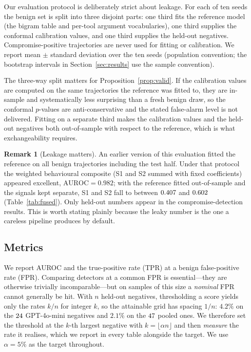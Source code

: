 \documentclass[preprint,12pt,authoryear]{elsarticle}
\theoremstyle{definition}
\newtheorem{remark}{Remark}
\begin{document}
Our evaluation protocol is deliberately strict about leakage. For each of ten
seeds the benign set is split into three disjoint parts: one third fits the
reference model (the bigram table and per-tool argument vocabularies), one third
supplies the conformal calibration values, and one third supplies the held-out
negatives. Compromise-positive trajectories are never used for fitting or
calibration. We report mean $\pm$ standard deviation over the ten seeds (population
convention; the bootstrap intervals in Section~\ref{sec:results} use the sample
convention).

The three-way split matters for Proposition~\ref{prop:valid}. If the calibration
values are computed on the same trajectories the reference was fitted to, they are
in-sample and systematically less surprising than a fresh benign draw, so the
conformal $p$-values are anti-conservative and the stated false-alarm level is not
delivered. Fitting on a separate third makes the calibration values and the
held-out negatives both out-of-sample with respect to the reference, which is what
exchangeability requires.

\begin{remark}[Leakage matters]
An earlier version of this evaluation fitted the reference on all benign
trajectories including the test half. Under that protocol the weighted behavioural
composite (S1 and S2 summed with fixed coefficients) appeared excellent,
$\mathrm{AUROC} = 0.982$; with the reference fitted out-of-sample and the signals
kept separate, S1 and S2 fall to between $0.407$ and $0.602$
(Table~\ref{tab:fused}). Only held-out numbers appear in the compromise-detection
results.
This is worth stating plainly because the leaky number is the one a careless
pipeline produces by default.
\end{remark}

\subsection{Metrics}\label{sec:metrics}

We report AUROC and the true-positive rate (TPR) at a benign false-positive rate
(FPR). Comparing detectors at a common FPR is essential---they are otherwise
trivially incomparable---but on samples of this size a \emph{nominal} FPR cannot
generally be hit. With $n$ held-out negatives, thresholding a score yields only
the rates $k/n$ for integer $k$, so the attainable grid has spacing $1/n$: $4.2\%$
on the $24$ GPT-4o-mini negatives and $2.1\%$ on the $47$ pooled ones. We
therefore set the threshold at the $k$-th largest negative with
$k = \lfloor \alpha n \rfloor$ and then \emph{measure} the rate it realises, which
we report in every table alongside the target. We use $\alpha = 5\%$ as the target
throughout.
\end{document}

